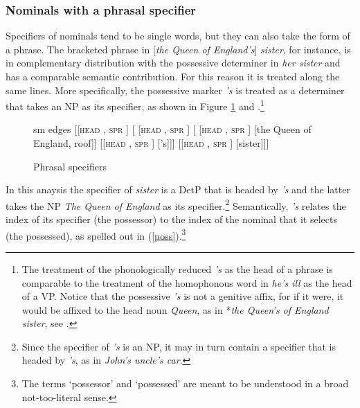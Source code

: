 \documentclass[output=paper
                ,modfonts
                ,nonflat
	        ,collection
	        ,collectionchapter
	        ,collectiontoclongg
 	        ,biblatex
                ,babelshorthands
                ,newtxmath
                ,draftmode
                ,colorlinks, citecolor=brown
]{./langsci/langscibook}
\begin{document}
\subsubsection{Nominals with a phrasal specifier} 


Specifiers of nominals tend to be single words, but they can also take the form 
of a phrase. The bracketed phrase in [\emph{the Queen of England's}] \emph{sister},
for instance, is in complementary distribution with the possessive
determiner in \emph{her sister} and has a comparable semantic contribution.   
For this reason it is treated along the same lines. More specifically, the 
possessive marker \emph{'s} is treated as a determiner that takes an NP as its specifier, 
as shown in Figure \ref{cousin} \citep[51--54]{ps2} and \citep[193]{GS00}.\footnote{The treatment 
of the phonologically reduced \emph{'s} as the head of a phrase is comparable to 
the treatment of the homophonous word in \emph{he's ill} as the head of a VP.
Notice that the possessive \emph{'s} is not a genitive affix, for if it were, it 
would be affixed to the head noun \emph{Queen}, as in *\emph{the Queen's of England sister}, see  
\citet[199]{SagWasow03}.}

\begin{figure}
	\centering
	\begin{forest}
sm edges
[{[\textsc{head}  , \textsc{spr} \eliste]}
	[{ [\textsc{head}  , \textsc{spr} \eliste]}
		[{ [\textsc{head} , \textsc{spr} \eliste]} [the Queen of England, roof]]
		[{[\textsc{head} , \textsc{spr} ]} ['s]]]
	[{[\textsc{head} , \textsc{spr} ]} [sister]]]
	\end{forest}
	\caption{\label{cousin} Phrasal specifiers }  
\end{figure}

In this anaysis the specifier of \emph{sister} is a DetP that is headed by \emph{'s} 
and the latter takes the NP \emph{The Queen of England} as its specifier.\footnote{Since the 
specifier of \emph{'s} is an NP, it may in turn contain a specifier that is headed 
by \emph{'s}, as in \emph{John's uncle's car}.}
Semantically, \emph{'s} relates the index of its specifier (the possessor) to the index
of the nominal that it selects (the possessed), as spelled out in (\ref{poss}).\footnote{The
terms `possessor' and `possessed' are meant to be understood in a broad not-too-literal sense.}     
\end{document}
